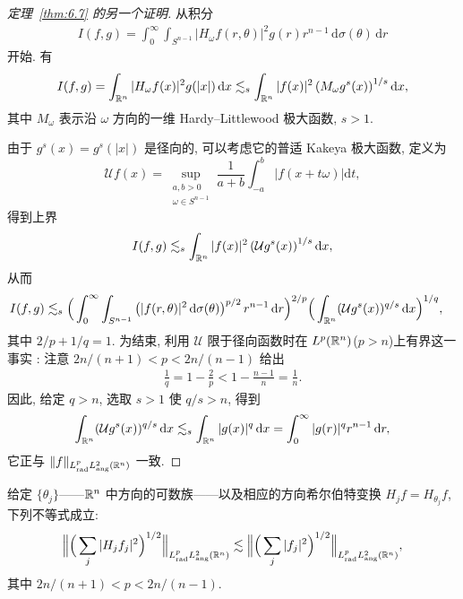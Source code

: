 \begin{proof}[定理~\ref{thm:6.7} 的另一个证明]
从积分
\begin{align*}
  I(f,g)=\int_{0}^{\infty}\int_{S^{n-1}}\left|H_{\omega}f(r,\theta)\right|^{2}g(r)r^{n-1}\,\mathrm{d}\sigma(\theta)\,\mathrm{d}r
\end{align*}
开始. 有
\begin{align*}
  I(f,g)=\int_{\mathbb{R}^{n}}|H_{\omega}f(x)|^{2}g(|x|)\,\mathrm{d}x
  \lesssim_{s}\int_{\mathbb{R}^{n}}|f(x)|^{2}\left(M_{\omega}g^{s}(x)\right)^{1/s}\mathrm{d}x,
\end{align*}
其中 $M_{\omega}$ 表示沿 $\omega$ 方向的一维 Hardy--Littlewood 极大函数, $s > 1$.

由于 $g^{s}(x) = g^{s}(|x|)$ 是径向的, 可以考虑它的普适 Kakeya 极大函数, 定义为
\begin{equation}\label{eq:6.6}
  \mathcal{U}f(x)=\sup_{\substack{a,b>0\\ \omega\in S^{n-1}}}\frac{1}{a+b}\int_{-a}^{b}\left|f(x+t\omega)\right|\mathrm{d}t,
\end{equation}
得到上界
\begin{align*}
  I(f,g)\lesssim_{s}\int_{\mathbb{R}^{n}}|f(x)|^{2}\left(\mathcal{U}g^{s}(x)\right)^{1/s}\mathrm{d}x,
\end{align*}
从而
\begin{align*}
  I(f,g)
  &\lesssim_{s}\Big(\int_{0}^{\infty}\int_{S^{n-1}}\left(|f(r,\theta)|^{2}\,\mathrm{d}\sigma(\theta)\right)^{p/2}r^{n-1}\,\mathrm{d}r\Big)^{2/p}
   \Big(\int_{\mathbb{R}^{n}}(\mathcal{U}g^{s}(x))^{q/s}\,\mathrm{d}x\Big)^{1/q},
\end{align*}
其中 $2/p + 1/q = 1$. 为结束, 利用 $\mathcal{U}$ 限于径向函数时在 $L^p(\mathbb{R}^n)$($p > n$)上有界这一事实 \cite{b132}: 注意 $2n/(n+1) < p < 2n/(n-1)$ 给出
\begin{align*}
  \frac{1}{q}=1-\frac{2}{p}<1-\frac{n-1}{n}=\frac{1}{n}.
\end{align*}
因此, 给定 $q > n$, 选取 $s > 1$ 使 $q/s > n$, 得到
\begin{align*}
  \int_{\mathbb{R}^{n}}(\mathcal{U}g^{s}(x))^{q/s}\,\mathrm{d}x
  \lesssim_{s}\int_{\mathbb{R}^{n}}|g(x)|^{q}\,\mathrm{d}x
  =\int_{0}^{\infty}|g(r)|^{q}r^{n-1}\,\mathrm{d}r,
\end{align*}
它正与 $\|f\|_{L_{\mathrm{rad}}^{p}L_{\mathrm{ang}}^{2}(\mathbb{R}^{n})}$ 一致.
\end{proof}

\begin{corollary}[Meyer 引理]\label{cor:6.8}
给定 $\{\theta_j\}$——$\mathbb{R}^n$ 中方向的可数族——以及相应的方向希尔伯特变换 $H_j f = H_{\theta_j} f$, 下列不等式成立:
\begin{align*}
  \Big\|\Big(\sum_{j}|H_{j}f_{j}|^{2}\Big)^{1/2}\Big\|_{L_{\mathrm{rad}}^{p}L_{\mathrm{ang}}^{2}(\mathbb{R}^{n})}
  \lesssim\Big\|\Big(\sum_{j}|f_{j}|^{2}\Big)^{1/2}\Big\|_{L_{\mathrm{rad}}^{p}L_{\mathrm{ang}}^{2}(\mathbb{R}^{n})},
\end{align*}
其中 $2n/(n+1) < p < 2n/(n-1)$.
\end{corollary}

